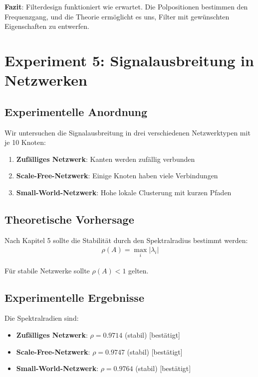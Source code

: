 ﻿\documentclass[a4paper,12pt]{report}
\theoremstyle{definition}
\begin{document}
	\textbf{Fazit}: Filterdesign funktioniert wie erwartet. Die Polpositionen bestimmen den Frequenzgang, und die Theorie ermöglicht es uns, Filter mit gewünschten Eigenschaften zu entwerfen.
	
	\section{Experiment 5: Signalausbreitung in Netzwerken}
	
	\subsection{Experimentelle Anordnung}
	
	Wir untersuchen die Signalausbreitung in drei verschiedenen Netzwerktypen mit je 10 Knoten:
	\begin{enumerate}
		\item[-] \textbf{Zufälliges Netzwerk}: Kanten werden zufällig verbunden
		\item[-] \textbf{Scale-Free-Netzwerk}: Einige Knoten haben viele Verbindungen
		\item[-] \textbf{Small-World-Netzwerk}: Hohe lokale Clusterung mit kurzen Pfaden
	\end{enumerate}
	
	\subsection{Theoretische Vorhersage}
	
	Nach Kapitel 5 sollte die Stabilität durch den Spektralradius bestimmt werden:
	\begin{align}
		\rho(A) = \max_i |\lambda_i|
	\end{align}
	
	Für stabile Netzwerke sollte $\rho(A) < 1$ gelten.
	
	\subsection{Experimentelle Ergebnisse}
	
	Die Spektralradien sind:
	\begin{itemize}
		\item[-] \textbf{Zufälliges Netzwerk}: $\rho = 0.9714$ (stabil) [bestätigt]
		\item[-] \textbf{Scale-Free-Netzwerk}: $\rho = 0.9747$ (stabil) [bestätigt]
		\item[-] \textbf{Small-World-Netzwerk}: $\rho = 0.9764$ (stabil) [bestätigt]
	\end{itemize}
	
\end{document}
